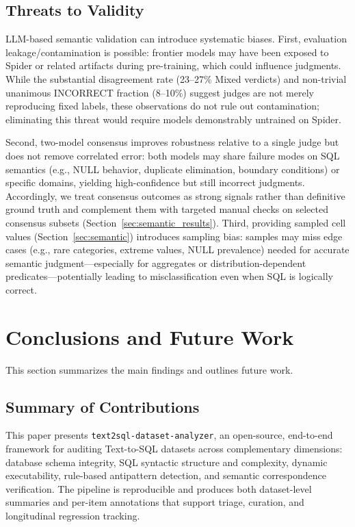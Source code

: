 \documentclass[]{einformatica}
\begin{document}
\subsection{Threats to Validity}

LLM-based semantic validation can introduce systematic biases. First, evaluation leakage/contamination is possible: frontier models may have been exposed to Spider or related artifacts during pre-training, which could influence judgments. While the substantial disagreement rate (23--27\% Mixed verdicts) and non-trivial unanimous INCORRECT fraction (8--10\%) suggest judges are not merely reproducing fixed labels, these observations do not rule out contamination; eliminating this threat would require models demonstrably untrained on Spider.

Second, two-model consensus improves robustness relative to a single judge but does not remove correlated error: both models may share failure modes on SQL semantics (e.g., NULL behavior, duplicate elimination, boundary conditions) or specific domains, yielding high-confidence but still incorrect judgments. Accordingly, we treat consensus outcomes as strong signals rather than definitive ground truth and complement them with targeted manual checks on selected consensus subsets (Section~\ref{sec:semantic_results}). Third, providing sampled cell values (Section~\ref{sec:semantic}) introduces sampling bias: samples may miss edge cases (e.g., rare categories, extreme values, NULL prevalence) needed for accurate semantic judgment---especially for aggregates or distribution-dependent predicates---potentially leading to misclassification even when SQL is logically correct.

\section{Conclusions and Future Work}\label{sec:Conclusions}

This section summarizes the main findings and outlines future work.

\subsection{Summary of Contributions}

This paper presents \texttt{text2sql-dataset-analyzer}, an open-source, end-to-end framework for auditing Text-to-SQL datasets across complementary dimensions: database schema integrity, SQL syntactic structure and complexity, dynamic executability, rule-based antipattern detection, and semantic correspondence verification. The pipeline is reproducible and produces both dataset-level summaries and per-item annotations that support triage, curation, and longitudinal regression tracking.
\end{document}
